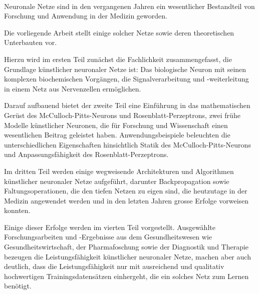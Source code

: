 \kurzfassung

\paragraph*{}

Neuronale Netze sind in den vergangenen Jahren ein wesentlicher Bestandteil von Forschung und Anwendung in der Medizin geworden.

Die vorliegende Arbeit stellt einige solcher Netze sowie deren theoretischen Unterbauten vor.

Hierzu wird im ersten Teil zunächst die Fachlichkeit zusammengefasst, die Grundlage künstlicher neuronaler Netze ist: Das biologische Neuron mit seinen komplexen biochemischen Vorgängen, die Signalverarbeitung und -weiterleitung in einem Netz aus Nervenzellen ermöglichen.

Darauf aufbauend bietet der zweite Teil eine Einführung in das mathematischen Gerüst des McCulloch-Pitts-Neurons und Rosenblatt-Perzeptrons, zwei frühe Modelle künstlicher Neuronen, die für Forschung und Wissenschaft einen wesentlichen Beitrag geleistet haben.
Anwendungsbeispiele beleuchten die unterschiedlichen Eigenschaften hinsichtlich Statik des McCulloch-Pitts-Neurons und Anpassungsfähigkeit des Rosenblatt-Perzeptrons.

Im dritten Teil werden einige wegweisende Architekturen und Algorithmen künstlicher neuronaler Netze aufgeführt, darunter  Backpropagation sowie Faltungsoperationen, die den tiefen Netzen zu eigen sind, die heutzutage in der Medizin angewendet werden und in den letzten Jahren grosse Erfolge vorweisen konnten.

Einige dieser Erfolge werden im vierten Teil vorgestellt.
Ausgewählte Forschungsarbeiten und -Ergebnisse aus dem Gesundheitswesen wie Gesundheitswirtschaft, der Pharmafoschung sowie der Diagnostik und Therapie bezeugen die Leistungsfähigkeit künstlicher neuronaler Netze, machen aber auch deutlich, dass die Leistungsfähigkeit nur mit ausreichend und qualitativ hochwertigen Trainingsdatensätzen einhergeht, die ein solches Netz zum Lernen benötigt.

